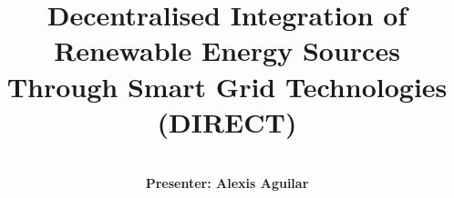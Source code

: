 \title[DIRECT]{Decentralised Integration of Renewable Energy Sources Through Smart Grid Technologies  \texorpdfstring{\\}{} (DIRECT)}

\author{\texorpdfstring{\\}{} \textbf{Presenter: Alexis Aguilar}}

                      


\date{}